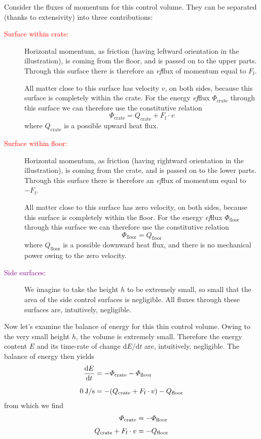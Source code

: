 \documentclass[a4paper,12pt,%
onecolumn,oneside,titlepage,%
british%
]{memoir}
\newcommand*{\di}{\mathrm{d}}%
\renewcommand*{\|}[1][]{\nonscript\:#1\vert\nonscript\:\mathopen{}}
\newcommand*{\yE}{E}
\newcommand*{\yH}{\varPhi}%
\newcommand*{\yHfl}{\yH_{\text{floor}}}
\newcommand*{\yHc}{\yH_{\text{crate}}}
\newcommand*{\yQ}{Q}%
\newcommand*{\yQc}{\yQ_{\text{crate}}}
\newcommand*{\yQfl}{\yQ_{\text{floor}}}
\newcommand*{\yFf}{F_{\text{f}}}
\begin{document}
Consider the fluxes of momentum for this control volume. They can be separated (thanks to extensivity) into three contributions:
\begin{description}
\item[\textcolor{red}{Surface within crate:}] Horizontal momentum, as friction (having leftward orientation in the illustration), is coming from the floor, and is passed on to the upper parts. Through this surface there is therefore an \emph{ef}flux of momentum equal to $\yFf$.

All matter close to this surface has velocity $v$, on both sides, because this surface is completely within the crate. For the energy \emph{ef}flux  $\yHc$ through this surface we can therefore use the constitutive relation
\begin{equation*}
  \yHc = \yQc +\yFf\cdot v
\end{equation*}
where $\yQc$ is a possible upward heat flux.

\item[\textcolor{red}{Surface within floor:}] Horizontal momentum, as friction (having rightward orientation in the illustration), is coming from the crate, and is passed on to the lower parts. Through this surface there is therefore an \emph{ef}flux of momentum equal to $-\yFf$.

  All matter close to this surface has zero velocity, on both sides, because this surface is completely within the floor. For the energy \emph{ef}flux $\yHfl$ through this surface we can therefore use the constitutive relation
\begin{equation*}
  \yHfl = \yQfl
\end{equation*}
where $\yQfl$ is a possible downward heat flux, and there is no mechanical power owing to the zero velocity.

\item[\textcolor{purple}{Side surfaces:}] We imagine to take the height $h$ to be extremely small, so small that the area of the side control surfaces is negligible. All fluxes through these surfaces are, intuitively, negligible.
\end{description}

Now let's examine the balance of energy for this thin control volume. Owing to the very small height $h$, the volume is extremely small. Therefore the energy content $\yE$ and its time-rate of change $\di\yE/\di t$ are, intuitively, negligible. The balance of energy then yields
\begin{equation*}
  \begin{aligned}
    \frac{\di\yE}{\di t} &= -\yHc -\yHfl
    \\[2\jot]
    \qty{0}{J/s}&= - (\yQc + \yFf\cdot v) - \yQfl
  \end{aligned}
\end{equation*}
from which we find
\begin{equation*}
  \begin{aligned}
    \yHc &= -\yHfl \\[\jot]  \yQc + \yFf \cdot v &= -\yQfl
  \end{aligned}
\end{equation*}
\end{document}
